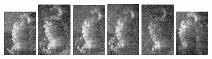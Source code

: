 \begin{figure}
    \includegraphics[width=0.15\textwidth]{chapters/images/dataset/all-class-images/hook/hook-31.jpg}
    \includegraphics[width=0.15\textwidth]{chapters/images/dataset/all-class-images/hook/hook-7.jpg}
    \includegraphics[width=0.15\textwidth]{chapters/images/dataset/all-class-images/hook/hook-25.jpg}    
    \includegraphics[width=0.15\textwidth]{chapters/images/dataset/all-class-images/hook/hook-22.jpg}    
    \includegraphics[width=0.15\textwidth]{chapters/images/dataset/all-class-images/hook/hook-9.jpg}
    \includegraphics[width=0.15\textwidth]{chapters/images/dataset/all-class-images/hook/hook-43.jpg}
    

\end{figure}
